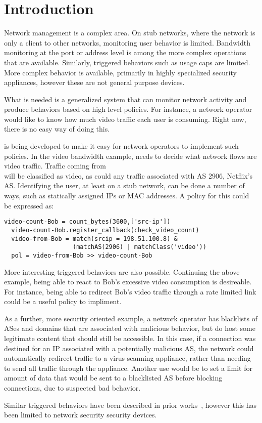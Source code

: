 \section{Introduction}
Network management is a complex area. On stub networks, where the network is only a client to other networks, monitoring user behavior is limited. Bandwidth monitoring at the port or address level is among the more complex operations that are available. Similarly, triggered behaviors such as usage caps are limited. 
More complex behavior is available, primarily in highly specialized security appliances, however these are not general purpose devices.

What is needed is a generalized system that can monitor network activity and produce behaviors based on high level policies. For instance, a network operator would like to know how much video traffic each user is consuming. Right now, there is no easy way of doing this. 

\system{} is being developed to make it easy for network operators to implement such policies. In the video bandwidth example, \system{} needs to decide what network flows are video traffic. Traffic coming from \\ will be classified as video, as could any traffic associated with AS 2906, Netflix's AS. Identifying the user, at least on a stub network, can be done a number of ways, such as statically assigned IPs or MAC addresses. A policy for this could be expressed as:

\begin{Verbatim}[fontsize=\small]
  video-count-Bob = count_bytes(3600,['src-ip'])
  video-count-Bob.register_callback(check_video_count)
  video-from-Bob = match(srcip = 198.51.100.8) & 
                   (matchAS(2906) | matchClass('video'))
  pol = video-from-Bob >> video-count-Bob
\end{Verbatim}
  

More interesting triggered behaviors are also possible. Continuing the above example, being able to react to Bob's excessive video consumption is desireable. For instance, being able to redirect Bob's video traffic through a rate limited link could be a useful policy to impliment. 

As a further, more security oriented example, a network operator has blacklists of ASes and domains that are associated with malicious behavior, but do host some legitimate content that should still be accessible. In this case, if a connection was destined for an IP associated with a potentially malicious AS, the network could automatically redirect traffic to a virus scanning appliance, rather than needing to send all traffic through the appliance. Another use would be to set a limit for amount of data that would be sent to a blacklisted AS before blocking connections, due to suspected bad behavior.

Similar triggered behaviors have been described in prior works~\cite{cloudwatcher}\cite{opensafe}, however this has been limited to network security security devices.
